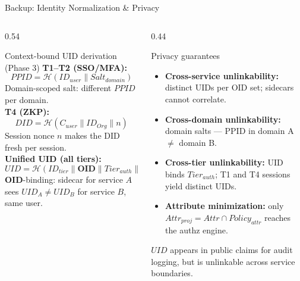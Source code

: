 \documentclass[aspectratio=169,11pt]{beamer}
\newcommand{\tightitems}{%
  \setlength{\topsep}{2pt}%
  \setlength{\itemsep}{4pt}%
  \setlength{\parsep}{0pt}%
}
\newcommand{\pinkbanner}[1]{%
  \begin{center}
  \begin{tcolorbox}[colback=fedacGray,colframe=fedacGray,
                    boxrule=0pt,arc=1mm,left=10pt,right=10pt,top=3pt,bottom=3pt,
                    width=0.96\linewidth,
                    borderline west={2pt}{0pt}{fedacTeal}]
  \footnotesize\color{fedacNavyD}#1
  \end{tcolorbox}
  \end{center}}
\begin{document}
{%
\begin{frame}[noframenumbering]{Backup: Identity Normalization \& Privacy}
\vspace{-8pt}
\begin{columns}[T,onlytextwidth]
\begin{column}{0.54\textwidth}
\begin{callout}{Context-bound UID derivation (Phase 3)}
\scriptsize
\textbf{T1--T2 (SSO/MFA):}
\vspace{-2pt}
\[ PPID = \mathcal{H}(ID_{user} \| Salt_{domain}) \]
\vspace{-6pt}
Domain-scoped salt: different $PPID$ per domain.\\[2pt]
\textbf{T4 (ZKP):}
\vspace{-2pt}
\[ DID = \mathcal{H}(C_{user} \| ID_{Org} \| n) \]
\vspace{-6pt}
Session nonce $n$ makes the DID fresh per session.\\[2pt]
\textbf{Unified UID (all tiers):}
\vspace{-2pt}
\[ UID = \mathcal{H}(ID_{tier} \| \mathbf{OID} \| Tier_{auth} \| Salt_{domain}) \]
\vspace{-2pt}
$\mathbf{OID}$-binding: sidecar for service $A$ sees $UID_A \neq UID_B$ for service $B$, same user.
\end{callout}
\end{column}
\begin{column}{0.44\textwidth}
\begin{callout}{Privacy guarantees}
\scriptsize
\begin{itemize}\tightitems
\item \textbf{Cross-service unlinkability:} distinct UIDs per OID set; sidecars cannot correlate.
\item \textbf{Cross-domain unlinkability:} domain salts — PPID in domain A $\neq$ domain B.
\item \textbf{Cross-tier unlinkability:} UID binds $Tier_{auth}$; T1 and T4 sessions yield distinct UIDs.
\item \textbf{Attribute minimization:} only $Attr_{proj} = Attr \cap Policy_{attr}$ reaches the authz engine.
\end{itemize}
\end{callout}
\vspace{1pt}
\pinkbanner{$UID$ appears in public claims for audit logging, but is unlinkable across service boundaries.}
\end{column}
\end{columns}
\end{frame}

}
\end{document}
